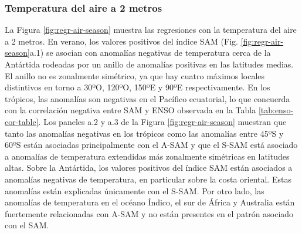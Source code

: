\documentclass[12pt,oneside,a4paper]{reedthesis}
\begin{document}
\hypertarget{temperatura-del-aire-a-2-metros}{%
\subsubsection{Temperatura del aire a 2 metros}\label{temperatura-del-aire-a-2-metros}}

La Figura \ref{fig:regr-air-season} muestra las regresiones con la temperatura del aire a 2 metros.
En verano, los valores positivos del índice SAM (Fig. \ref{fig:regr-air-season}a.1) se asocian con anomalías negativas de temperatura cerca de la Antártida rodeadas por un anillo de anomalías positivas en las latitudes medias.
El anillo no es zonalmente simétrico, ya que hay cuatro máximos locales distintivos en torno a 30ºO, 120ºO, 150ºE y 90ºE respectivamente.
En los trópicos, las anomalías son negativas en el Pacífico ecuatorial, lo que concuerda con la correlación negativa entre SAM y ENSO observada en la Tabla \ref{tab:enso-cor-table}.
Los paneles a.2 y a.3 de la Figura \ref{fig:regr-air-season} muestran que tanto las anomalías negativas en los trópicos como las anomalías entre 45ºS y 60ºS están asociadas principalmente con el A-SAM y que el S-SAM está asociado a anomalías de temperatura extendidas más zonalmente simétricas en latitudes altas.
Sobre la Antártida, los valores positivos del índice SAM están asociados a anomalías negativas de temperatura, en particular sobre la costa oriental.
Estas anomalías están explicadas únicamente con el S-SAM.
Por otro lado, las anomalías de temperatura en el océano Índico, el sur de África y Australia están fuertemente relacionadas con A-SAM y no están presentes en el patrón asociado con el SAM.
\end{document}
